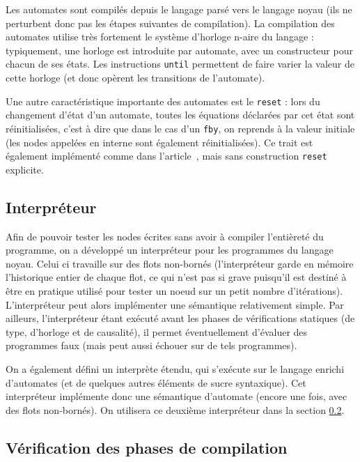 \documentclass{article}
\begin{document}
Les automates sont compilés depuis le langage parsé vers le langage noyau (ils ne perturbent donc pas les étapes suivantes de compilation). La compilation des automates utilise très fortement le système d'horloge n-aire du langage : typiquement, une horloge est introduite par automate, avec un constructeur pour chacun de ses états. Les instructions \lstinline{until} permettent de faire varier la valeur de cette horloge (et donc opèrent les transitions de l'automate).

Une autre caractéristique importante des automates est le \lstinline{reset} : lors du changement d'état d'un automate, toutes les équations déclarées par cet état sont réinitialisées, c'est à dire que dans le cas d'un \lstinline{fby}, on reprends à la valeur initiale (les nodes appelées en interne sont également réinitialisées). Ce trait est également implémenté comme dans l'article~\cite{Colaco05}, mais sans construction \lstinline{reset} explicite.

\subsection{Interpréteur}
\label{interpreter}

Afin de pouvoir tester les nodes écrites sans avoir à compiler l'entièreté du programme, on a développé un interpréteur pour les programmes du langage noyau. Celui ci travaille sur des flots non-bornés (l'interpréteur garde en mémoire l'historique entier de chaque flot, ce qui n'est pas si grave puisqu'il est destiné à être en pratique utilisé pour tester un noeud sur un petit nombre d'itérations). L'interpréteur peut alors implémenter une sémantique relativement simple. Par ailleurs, l'interpréteur étant exécuté avant les phases de vérifications statiques (de type, d'horloge et de causalité), il permet éventuellement d'évaluer des programmes faux (mais peut aussi échouer sur de tels programmes). 

On a également défini un interprète étendu, qui s'exécute sur le langage enrichi d'automates (et de quelques autres éléments de sucre syntaxique). Cet interpréteur implémente donc une sémantique d'automate (encore une fois, avec des flots non-bornés). On utilisera ce deuxième interpréteur dans la section \ref{compilVerif}.

\subsection{Vérification des phases de compilation}
\label{compilVerif}
\end{document}
